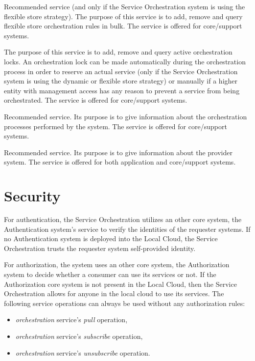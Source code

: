 \documentclass[a4paper]{arrowhead}
\begin{document}
Recommended service (and only if the Service Orchestration system is using the flexible store strategy). The purpose of this service is to add, remove and query flexible store orchestration rules in bulk. The service is offered for core/support systems.

The purpose of this service is to add, remove and query active orchestration locks. An orchestration lock can be made automatically during the orchestration process in order to reserve an actual service (only if the Service Orchestration system is using the dynamic or flexible store strategy) or manually if a higher entity with management access has any reason to prevent a service from being orchestrated. The service is offered for core/support systems.

Recommended service. Its purpose is to give information about the orchestration processes performed by the system. The service is offered for core/support systems.

Recommended service. Its purpose is to give information about the provider system. The service is offered for both application and core/support systems. 

\newpage

\section{Security}
\label{sec:security}

For authentication, the Service Orchestration utilizes an other core system, the Authentication system's service to verify the identities of the requester systems. If no Authentication system is deployed into the Local Cloud, the Service Orchestration trusts the requester system self-provided identity.

For authorization, the system uses an other core system, the Authorization system to decide whether a consumer can use its services or not. If the Authorization core system is not present in the Local Cloud, then the Service Orchestration allows for anyone in the local cloud to use its services. The following service operations can always be used without any authorization rules:

\begin{itemize}
    \item \textit{orchestration} service's \textit{pull} operation,
    \item \textit{orchestration} service's \textit{subscribe} operation,
    \item \textit{orchestration} service's \textit{unsubscribe} operation.
\end{itemize}
\end{document}

